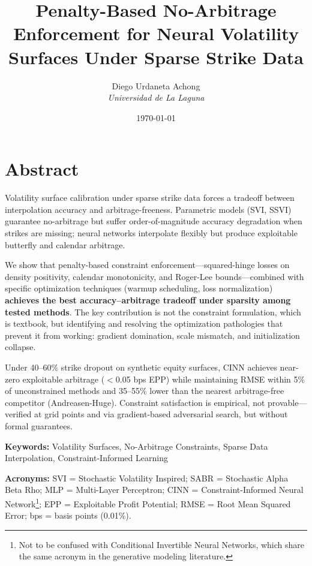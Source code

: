 \documentclass[11pt,a4paper]{article}
\title{Penalty-Based No-Arbitrage Enforcement for Neural Volatility Surfaces Under Sparse Strike Data}
\author{
    Diego Urdaneta Achong\\
    \textit{Universidad de La Laguna}\\
}
\date{\today}
\begin{document}
\maketitle


\renewcommand{\abstractname}{\large Abstract}
\renewenvironment{abstract}
  {\section*{\abstractname}\noindent}
  {\par\bigskip}

\begin{abstract}
Volatility surface calibration under sparse strike data forces a tradeoff between interpolation accuracy and arbitrage-freeness. Parametric models (SVI, SSVI) guarantee no-arbitrage but suffer order-of-magnitude accuracy degradation when strikes are missing; neural networks interpolate flexibly but produce exploitable butterfly and calendar arbitrage.

We show that penalty-based constraint enforcement---squared-hinge losses on density positivity, calendar monotonicity, and Roger-Lee bounds---combined with specific optimization techniques (warmup scheduling, loss normalization) \textbf{achieves the best accuracy--arbitrage tradeoff under sparsity among tested methods}. The key contribution is not the constraint formulation, which is textbook, but identifying and resolving the optimization pathologies that prevent it from working: gradient domination, scale mismatch, and initialization collapse.

Under 40--60\% strike dropout on synthetic equity surfaces, CINN achieves near-zero exploitable arbitrage ($<$0.05 bps EPP) while maintaining RMSE within 5\% of unconstrained methods and 35--55\% lower than the nearest arbitrage-free competitor (Andreasen-Huge). Constraint satisfaction is empirical, not provable---verified at grid points and via gradient-based adversarial search, but without formal guarantees.
\end{abstract}

\textbf{Keywords:} Volatility Surfaces, No-Arbitrage Constraints, Sparse Data Interpolation, Constraint-Informed Learning

\textbf{Acronyms:} SVI = Stochastic Volatility Inspired; SABR = Stochastic Alpha Beta Rho; MLP = Multi-Layer Perceptron; CINN = Constraint-Informed Neural Network\footnote{Not to be confused with Conditional Invertible Neural Networks, which share the same acronym in the generative modeling literature.}; EPP = Exploitable Profit Potential; RMSE = Root Mean Squared Error; bps = basis points (0.01\%).
\end{document}
